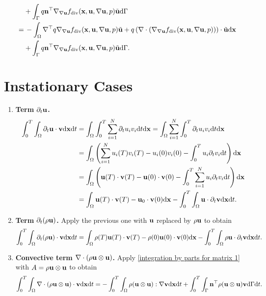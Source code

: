 \documentclass[oneside,11pt]{book}
\numberwithin{equation}{section}
\begin{document}
\begin{enumerate}[leftmargin=0mm]
\begin{align*}
        &+ \int_\Gamma q{\bf n}^\top\nabla_{\nabla{\bf u}}f_{\rm div}({\bf x},{\bf u},\nabla{\bf u},p)\tilde{\bf u}{\rm d}\Gamma\\
        =&\, -\int_\Omega \nabla^\top q\nabla_{\nabla{\bf u}}f_{\rm div}({\bf x},{\bf u},\nabla{\bf u},p)\tilde{\bf u} + q\left(\nabla\cdot\left(\nabla_{\nabla{\bf u}}f_{\rm div}({\bf x},{\bf u},\nabla{\bf u},p)\right)\right)\cdot\tilde{\bf u}{\rm d}{\bf x}\\
        &+ \int_\Gamma q{\bf n}^\top\nabla_{\nabla{\bf u}}f_{\rm div}({\bf x},{\bf u},\nabla{\bf u},p)\tilde{\bf u}{\rm d}\Gamma.
    \end{align*}
\end{enumerate}

\section{Instationary Cases}
\begin{enumerate}[leftmargin=5mm]
    \item \textbf{Term $\partial_t{\bf u}$.}
    \begin{align*}
        \int_0^T\int_\Omega \partial_t{\bf u}\cdot{\bf v}{\rm d}{\bf x}{\rm d}t &= \int_\Omega\int_0^T \sum_{i=1}^N \partial_tu_iv_i{\rm d}t{\rm d}{\bf x} = \int_\Omega\sum_{i=1}^N \int_0^T \partial_tu_iv_i{\rm d}t{\rm d}{\bf x}\\
        &= \int_\Omega \left(\sum_{i=1}^N u_i(T)v_i(T) - u_i(0)v_i(0) - \int_0^T u_i\partial_tv_i{\rm d}t\right){\rm d}{\bf x}\\
        &= \int_\Omega \left({\bf u}(T)\cdot{\bf v}(T) - {\bf u}(0)\cdot{\bf v}(0) - \int_0^T \sum_{i=1}^N u_i\partial_tv_i{\rm d}t\right){\rm d}{\bf x}\\
        &= \int_\Omega {\bf u}(T)\cdot{\bf v}(T) - {\bf u}_0\cdot{\bf v}(0){\rm d}{\bf x} - \int_0^T\int_\Omega {\bf u}\cdot\partial_t{\bf v}{\rm d}{\bf x}{\rm d}t.
    \end{align*}
    \item \textbf{Term $\partial_t(\rho{\bf u})$.} Apply the previous one with ${\bf u}$ replaced by $\rho{\bf u}$ to obtain
    \begin{align*}
        \int_0^T\int_\Omega \partial_t(\rho{\bf u})\cdot{\bf v}{\rm d}{\bf x}{\rm d}t = \int_\Omega \rho(T){\bf u}(T)\cdot{\bf v}(T) - \rho(0){\bf u}(0)\cdot{\bf v}(0){\rm d}{\bf x} - \int_0^T\int_\Omega \rho{\bf u}\cdot\partial_t{\bf v}{\rm d}{\bf x}{\rm d}t.
    \end{align*}
    \item \textbf{Convective term $\nabla\cdot(\rho{\bf u}\otimes{\bf u})$.} Apply \eqref{integration by parts for matrix 1} with $A = \rho{\bf u}\otimes{\bf u}$ to obtain
    \begin{align*}
        \int_0^T\int_\Omega \nabla\cdot(\rho{\bf u}\otimes{\bf u})\cdot{\bf v}{\rm d}{\bf x}{\rm d}t = -\int_0^T\int_\Omega \rho({\bf u}\otimes{\bf u}):\nabla{\bf v}{\rm d}{\bf x}{\rm d}t + \int_0^T\int_\Gamma {\bf n}^\top\rho({\bf u}\otimes{\bf u}){\bf v}{\rm d}\Gamma{\rm d}t.
    \end{align*}
\end{enumerate}


\printbibliography[heading=bibintoc]
\end{document}
